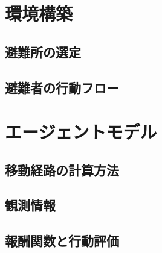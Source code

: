 \section{環境構築}
  \subsection{避難所の選定}
  \subsection{避難者の行動フロー}
\section{エージェントモデル}
  \subsection{移動経路の計算方法}
  \subsection{観測情報}
  \subsection{報酬関数と行動評価}
  
